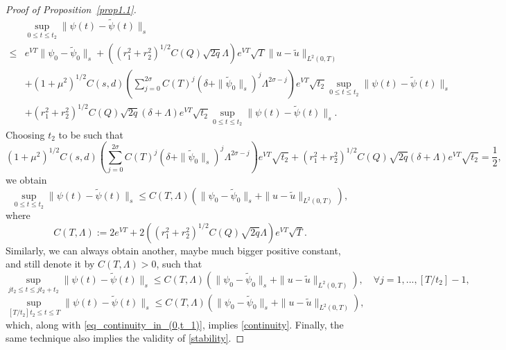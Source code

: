 \documentclass[review]{elsarticle}
\theoremstyle{dotless}
\def \leq{\leqslant}
\numberwithin{equation}{section}
\begin{document}
\begin{proof}[Proof of Proposition~\ref{prop1.1}]
	\begin{equation*}
		\begin{aligned}
			&\sup _{0 \leq t \leq t_2}\|\psi(t)-\tilde{\psi}(t)\|_{s} \\ 
			\leq & e^{VT}  \|\psi_0-\tilde{\psi}_0 \|_{s}+\left((r_1^2+r_2^2)^{1/2}C(Q)\sqrt{2q}\Lambda\right)e^{VT}\sqrt{T}\|u-\tilde{u}\|_{L^2(0,T)}  \\
			& + (1+ \mu^2)^{1/2} C\left(s,d\right) \left(\sum_{j=0}^{2\sigma} C(T)^j\left(\delta+\|\tilde{\psi}_0\|_s\right)^j \Lambda^{2\sigma-j}\right)e^{VT} \sqrt{t_2} \sup _{0 \leq t \leq t_2}\|\psi(t)-\tilde{\psi}(t)\|_{s} \\
			&+ (r_1^2+r_2^2)^{1/2}C(Q)\sqrt{2q}\left(\delta+\Lambda\right)e^{VT}\sqrt{t_2}\sup _{0 \leq t \leq t_2}\|\psi(t)-\tilde{\psi}(t)\|_{s}.
		\end{aligned}
	\end{equation*} Choosing $ t_2 $ to be such that
	\begin{equation*}
		(1+ \mu^2)^{1/2} C\left(s,d\right) \left(\sum_{j=0}^{2\sigma} C(T)^j\left(\delta+\|\tilde{\psi}_0\|_s\right)^j \Lambda^{2\sigma-j}\right)e^{VT} \sqrt{t_2}+ (r_1^2+r_2^2)^{1/2}C(Q)\sqrt{2q}\left(\delta+\Lambda\right)e^{VT}\sqrt{t_2}=\frac12,
	\end{equation*}
	we obtain
	\begin{equation}\label{eq_continuity_in_(0,t_1)}
		\sup _{0 \leq t \leq t_2}\|\psi(t)-\tilde{\psi}(t)\|_{s} \leq C(T,\Lambda) \left(\|\psi_0-\tilde{\psi}_0 \|_{s}+ \|u-\tilde{u}\|_{L^2(0,T)}\right),
	\end{equation}where
	\begin{equation*}
		C(T,\Lambda):=2  e^{VT} + 2\left((r_1^2+r_2^2)^{1/2}C(Q)\sqrt{2q}\Lambda\right)e^{VT}\sqrt{T}.
	\end{equation*}
	Similarly, we can always obtain another, maybe much bigger positive constant, and still denote it by $C(T,\Lambda)>0$, such that
	\begin{equation*}
		\sup _{jt_2 \leq t \leq jt_2+t_2}\|\psi(t)-\tilde{\psi}(t)\|_{s} \leq  C(T,\Lambda)\left(\|\psi_0-\tilde{\psi}_0 \|_{s}+\|u-\tilde{u}\|_{L^2(0,T)}\right), \quad \forall j=1,...,[T/t_2]-1,
	\end{equation*}
	\begin{equation*}
		\sup _{[T/t_2]t_2 \leq t \leq T}\|\psi(t)-\tilde{\psi}(t)\|_{s} \leq  C(T,\Lambda)\left(\|\psi_0-\tilde{\psi}_0 \|_{s}+\|u-\tilde{u}\|_{L^2(0,T)}\right),
	\end{equation*}which, along with \eqref{eq_continuity_in_(0,t_1)}, implies \eqref{continuity}.
	Finally, the same technique also implies the validity of \eqref{stability}.
\end{proof}
\end{document}
